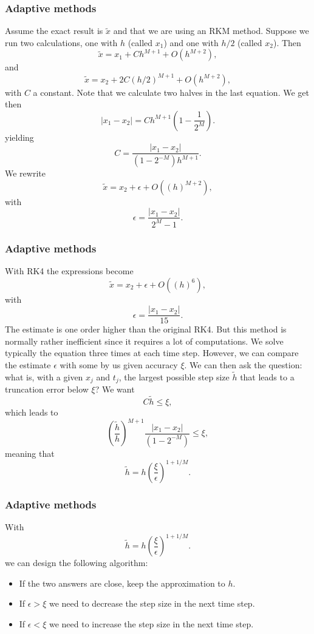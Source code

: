 \documentclass{beamer}
\begin{document}
\begin{frame}
\frametitle{Adaptive methods}

\begin{block}{}
Assume the exact result is $\tilde{x}$ and that we are using an RKM method. Suppose we run two calculations, one with $h$ (called $x_1$) and one with $h/2$ (called $x_2$). Then
\[
\tilde{x}=x_1+Ch^{M+1}+O(h^{M+2}),
\] 
and
\[
\tilde{x}=x_2+2C(h/2)^{M+1}+O(h^{M+2}),
\] 
with $C$ a constant. Note that we calculate two halves in the last equation. We get then
\[
|x_1-x_2| = Ch^{M+1}(1-\frac{1}{2^M}).
\]
yielding
\[
C=\frac{|x_1-x_2|}{(1-2^{-M})h^{M+1}}.
\]
We rewrite
\[
\tilde{x}=x_2+\epsilon+O((h)^{M+2}),
\] 
with 
\[
\epsilon = \frac{|x_1-x_2|}{2^M-1}.
\]
\end{block}
\end{frame}

\begin{frame}
\frametitle{Adaptive methods}

\begin{block}{}
With RK4 the expressions become
\[
\tilde{x}=x_2+\epsilon+O((h)^{6}),
\] 
with
\[
\epsilon = \frac{|x_1-x_2|}{15}.
\]
The estimate is one order higher than the original RK4. But this method is normally rather inefficient since it requires a lot of computations. We solve typically the equation three times at each time step. 
However, we can compare the estimate $\epsilon$ with some by us given accuracy $\xi$. 
We can then ask the question: what is, with a given $x_j$ and $t_j$, the largest possible step size $\tilde{h}$ that leads to a truncation error below $\xi$?
We want
\[
C\tilde{h} \le \xi,
\]
which leads to 
\[
\left(\frac{\tilde{h}}{h}\right)^{M+1}\frac{|x_1-x_2|}{(1-2^{-M})}\le \xi, 
\]
meaning that
\[
\tilde{h}=h\left(\frac{\xi}{\epsilon}\right)^{1+1/M}. 
\]
\end{block}
\end{frame}

\begin{frame}
\frametitle{Adaptive methods}

\begin{block}{}
With 
\[
\tilde{h}=h\left(\frac{\xi}{\epsilon}\right)^{1+1/M}. 
\]
we can design the following algorithm:
\begin{itemize}
 \item If the two answers are close, keep the approximation to $h$.

 \item If $\epsilon > \xi$ we need to decrease the step size in the next time step.

 \item If $\epsilon < \xi$ we need to increase the step size in the next time step.
\end{itemize}

\noindent
\end{block}
\end{frame}
\end{document}
